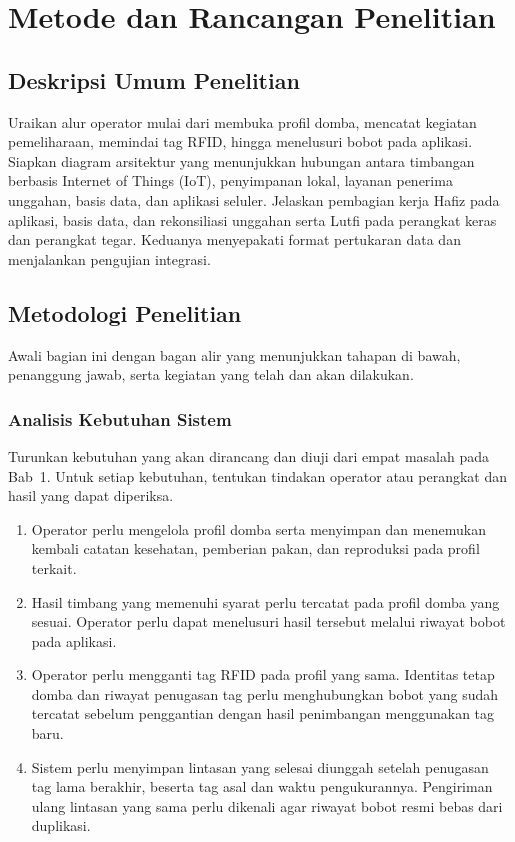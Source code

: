 \documentclass[12pt,a4paper]{report}
\begin{document}
\chapter{Metode dan Rancangan Penelitian}

\section{Deskripsi Umum Penelitian}
Uraikan alur operator mulai dari membuka profil domba, mencatat kegiatan
pemeliharaan, memindai tag RFID, hingga menelusuri bobot pada aplikasi.
Siapkan diagram arsitektur yang menunjukkan hubungan antara timbangan berbasis
Internet of Things (IoT), penyimpanan lokal, layanan penerima unggahan,
basis data, dan aplikasi seluler. Jelaskan pembagian kerja Hafiz pada
aplikasi, basis data, dan rekonsiliasi unggahan serta Lutfi pada perangkat
keras dan perangkat tegar. Keduanya menyepakati format pertukaran data dan
menjalankan pengujian integrasi.

\section{Metodologi Penelitian}
Awali bagian ini dengan bagan alir yang menunjukkan tahapan di bawah,
penanggung jawab, serta kegiatan yang telah dan akan dilakukan.

\subsection{Analisis Kebutuhan Sistem}
Turunkan kebutuhan yang akan dirancang dan diuji dari empat masalah pada
Bab~1. Untuk setiap kebutuhan, tentukan tindakan operator atau perangkat
dan hasil yang dapat diperiksa.
\begin{enumerate}
\item Operator perlu mengelola profil domba serta menyimpan dan menemukan
kembali catatan kesehatan, pemberian pakan, dan reproduksi pada profil terkait.
\item Hasil timbang yang memenuhi syarat perlu tercatat pada profil domba
yang sesuai. Operator perlu dapat menelusuri hasil tersebut melalui riwayat
bobot pada aplikasi.
\item Operator perlu mengganti tag RFID pada profil yang sama. Identitas tetap
domba dan riwayat penugasan tag perlu menghubungkan bobot yang sudah tercatat
sebelum penggantian dengan hasil penimbangan menggunakan tag baru.
\item Sistem perlu menyimpan lintasan yang selesai diunggah setelah penugasan
tag lama berakhir, beserta tag asal dan waktu pengukurannya. Pengiriman ulang
lintasan yang sama perlu dikenali agar riwayat bobot resmi bebas dari duplikasi.
\end{enumerate}
\end{document}
